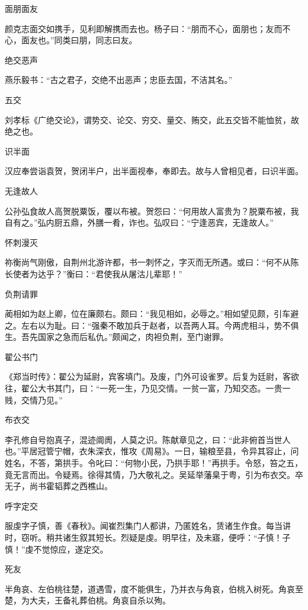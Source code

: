 \documentclass[a4paper,12pt,UTF8,twoside]{ctexbook}
\begin{document}
    面朋面友
    
    颜克志面交如携手，见利即解携而去也。杨子曰：“朋而不心，面朋也；友而不心，面友也。”同类曰朋，同志曰友。
    
    绝交恶声
    
    燕乐毅书：“古之君子，交绝不出恶声；忠臣去国，不洁其名。”
    
    五交
    
    刘孝标《广绝交论》，谓势交、论交、穷交、量交、贿交，此五交皆不能恤贫，故绝之也。
    
    识半面
    
    汉应奉尝诣袁贺，贺闭半户，出半面视奉，奉即去。故与人曾相见者，曰识半面。
    
    无逢故人
    
    公孙弘食故人高贺脱粟饭，覆以布被。贺怨曰：“何用故人富贵为？脱粟布被，我自有之。”弘内厨五鼎，外膳一肴，诈也。弘叹曰：“宁逢恶宾，无逢故人。”
    
    怀刺漫灭
    
    祢衡尚气刚傲，自荆州北游许都，书一刺怀之，字灭而无所遇。或曰：“何不从陈长使者为达乎？”衡曰：“君使我从屠沽儿辈耶！”
    
    负荆请罪
    
    蔺相如为赵上卿，位在廉颇右。颇曰：“我见相如，必辱之。”相如望见颇，引车避之。左右以为耻。曰：“强秦不敢加兵于赵者，以吾两人耳。今两虎相斗，势不俱生。吾先国家之急而后私仇。”颇闻之，肉袒负荆，至门谢罪。
    
    翟公书门
    
    《郑当时传》：翟公为延尉，宾客填门。及废，门外可设雀罗。后复为廷尉，客欲往，翟公大书其门，曰：“一死一生，乃见交情。一贫一富，乃知交态。一贵一贱，交情乃见。”
    
    布衣交
    
    李孔修自号抱真子，混迹阛阓，人莫之识。陈献章见之，曰：“此非俯首当世人也。”平居冠管宁帽，衣朱深衣，惟攻《周易》。一日，输粮至县，令异其容止，问姓名，不答，第拱手。令叱曰：“何物小民，乃拱手耶！”再拱手。令怒，笞之五，竟无言而出。令疑焉。徐得其情，乃大敬礼之。吴延举藩臬于粤，引为布衣交。卒无子，尚书霍韬葬之西樵山。
    
    呼字定交
    
    服虔字子慎，善《春秋》。闻崔烈集门人都讲，乃匿姓名，赁诸生作食。每当讲时，窃听。稍共诸生叙其短长。烈疑是虔。明早往，及未寤，便呼：“子慎！子慎！”虔不觉惊应，遂定交。
    
    死友
    
    半角哀、左伯桃往楚，道遇雪，度不能俱生，乃并衣与角哀，伯桃入树死。角哀至楚，为大夫，王备礼葬伯桃。角哀自杀以殉。
    
\end{document}
